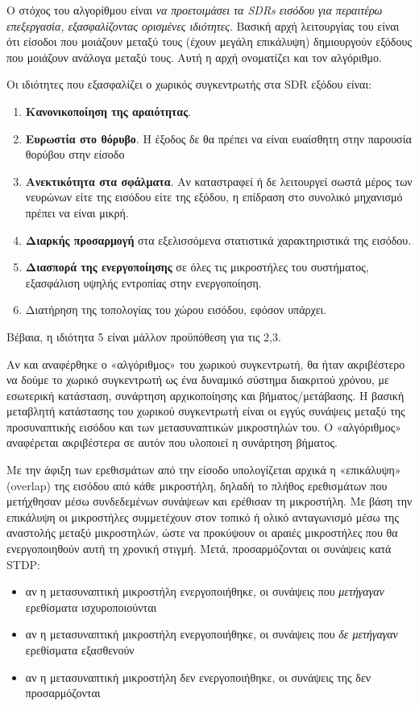 	Ο στόχος του αλγορίθμου είναι \textit{να προετοιμάσει τα SDRs εισόδου για περαιτέρω επεξεργασία, εξασφαλίζοντας ορισμένες ιδιότητες}.
	Βασική αρχή λειτουργίας του είναι ότι είσοδοι που μοιάζουν μεταξύ τους (έχουν μεγάλη επικάλυψη) δημιουργούν εξόδους που μοιάζουν ανάλογα μεταξύ τους.
	Αυτή η αρχή ονοματίζει και τον αλγόριθμο.

	Οι ιδιότητες που εξασφαλίζει ο χωρικός συγκεντρωτής στα SDR εξόδου είναι:
	\begin{enumerate}
		\item \textbf{Κανονικοποίηση της αραιότητας}.
		\item \textbf{Ευρωστία στο θόρυβο}. Η έξοδος δε θα πρέπει να είναι ευαίσθητη στην παρουσία θορύβου στην είσοδο
		\item \textbf{Ανεκτικότητα στα σφάλματα}. Αν καταστραφεί ή δε λειτουργεί σωστά μέρος των νευρώνων είτε της εισόδου είτε της εξόδου, η επίδραση στο συνολικό μηχανισμό πρέπει να είναι μικρή.
		\item \textbf{Διαρκής προσαρμογή} στα εξελισσόμενα στατιστικά χαρακτηριστικά της εισόδου.
		\item \textbf{Διασπορά της ενεργοποίησης} σε όλες τις μικροστήλες του συστήματος, εξασφάλιση υψηλής εντροπίας στην ενεργοποίηση.
		\item Διατήρηση της τοπολογίας του χώρου εισόδου, εφόσον υπάρχει.
	\end{enumerate}
	Βέβαια, η ιδιότητα 5 είναι μάλλον προϋπόθεση για τις 2,3.

	Αν και αναφέρθηκε ο «αλγόριθμος» του χωρικού συγκεντρωτή, θα ήταν ακριβέστερο να δούμε το χωρικό συγκεντρωτή ως ένα δυναμικό σύστημα διακριτού χρόνου,
	με εσωτερική κατάσταση, συνάρτηση αρχικοποίησης και βήματος/μετάβασης.
	Η βασική μεταβλητή κατάστασης του χωρικού συγκεντρωτή είναι οι εγγύς συνάψεις μεταξύ της προσυναπτικής εισόδου και των μετασυναπτικών μικροστηλών του.
	Ο «αλγόριθμος» αναφέρεται ακριβέστερα σε αυτόν που υλοποιεί η συνάρτηση βήματος.

	Με την άφιξη των ερεθισμάτων από την είσοδο υπολογίζεται αρχικά η «επικάλυψη» (overlap) της εισόδου από κάθε μικροστήλη,
	δηλαδή το πλήθος ερεθισμάτων που μετήχθησαν μέσω συνδεδεμένων συνάψεων και ερέθισαν τη μικροστήλη.
	Με βάση την επικάλυψη οι μικροστήλες συμμετέχουν στον τοπικό ή ολικό ανταγωνισμό μέσω της αναστολής μεταξύ μικροστηλών,
	ώστε να προκύψουν οι αραιές μικροστήλες που θα ενεργοποιηθούν αυτή τη χρονική στιγμή.
	Μετά, προσαρμόζονται οι συνάψεις κατά STDP:
	\begin{itemize}
		\item αν η μετασυναπτική μικροστήλη ενεργοποιήθηκε, οι συνάψεις που \textit{μετήγαγαν} ερεθίσματα ισχυροποιούνται
		\item αν η μετασυναπτική μικροστήλη ενεργοποιήθηκε, οι συνάψεις που \textit{δε μετήγαγαν} ερεθίσματα εξασθενούν
		\item αν η μετασυναπτική μικροστήλη δεν ενεργοποιήθηκε, οι συνάψεις της δεν προσαρμόζονται
	\end{itemize}

